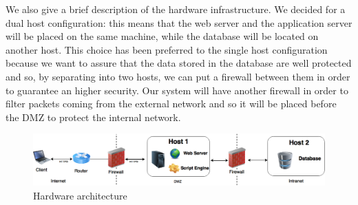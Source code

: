 We also give a brief description of the hardware infrastructure. We decided for a dual host configuration: this means that the web server and the application server will be placed on the same machine, while the database will be located on another host. This choice has been preferred to the single host configuration because we want to assure that the data stored in the database are well protected and so, by separating into two hosts, we can put a firewall between them in order to guarantee an higher security.
\newline
Our system will have another firewall in order to filter packets coming from the external network and so it will be placed before the DMZ to protect the internal network.
\begin{figure}[H]
            \centering
            \includegraphics[width=14cm]{./Images/HardwareArchitecture.png}
            \caption{Hardware architecture}
\end{figure}